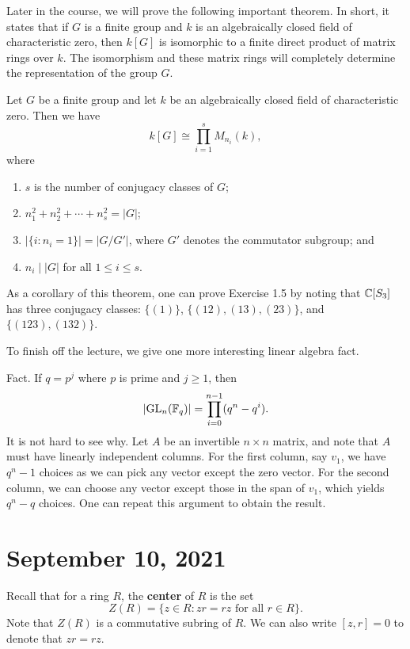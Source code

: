 Later in the course, we will prove the following important theorem. In short, it states that if 
$G$ is a finite group and $k$ is an algebraically closed field of characteristic zero, then $k[G]$ is
isomorphic to a finite direct product of matrix rings over $k$. The isomorphism and these matrix rings
will completely determine the representation of the group $G$. 

\begin{thm}
Let $G$ be a finite group and let $k$ be an algebraically closed field of characteristic zero. 
Then we have 
\[ k[G] \cong \prod_{i=1}^s M_{n_i}(k), \]
where
\begin{enumerate}[(1)]
    \item $s$ is the number of conjugacy classes of $G$;
    \item $n_1^2 + n_2^2 + \cdots + n_s^2 = |G|$;
    \item $|\{i : n_i = 1\}| = |G/G'|$, where $G'$ denotes the commutator subgroup; and 
    \item $n_i \mid |G|$ for all $1 \leq i \leq s$. 
\end{enumerate}
\end{thm}

As a corollary of this theorem, one can prove Exercise 1.5 by noting that $\mathbb{C}[S_3]$ has three 
conjugacy classes: $\{(1)\}$, $\{(12), (13), (23)\}$, and $\{(123), (132)\}$. 

To finish off the lecture, we give one more interesting linear algebra fact. 

{\sc Fact.} If $q = p^j$ where $p$ is prime and $j \geq 1$, then 
\[ \lvert\operatorname{GL}_n(\mathbb{F}_q)\rvert = \prod_{i=0}^{n-1} (q^n - q^i). \]
It is not hard to see why. Let $A$ be an invertible $n \times n$ matrix, and note that $A$ must 
have linearly independent columns. For the first column, say $v_1$, we have 
$q^n - 1$ choices as we can pick any vector except the zero vector. For the second column, 
we can choose any vector except those in the span of $v_1$, which yields $q^n - q$ choices. 
One can repeat this argument to obtain the result. 

\section{September 10, 2021}

Recall that for a ring $R$, the {\bf center} of $R$ is the set 
\[ Z(R) = \{z \in R : zr = rz \text{ for all } r \in R\}. \]
Note that $Z(R)$ is a commutative subring of $R$. We can also write $[z, r] = 0$ to 
denote that $zr = rz$. 

